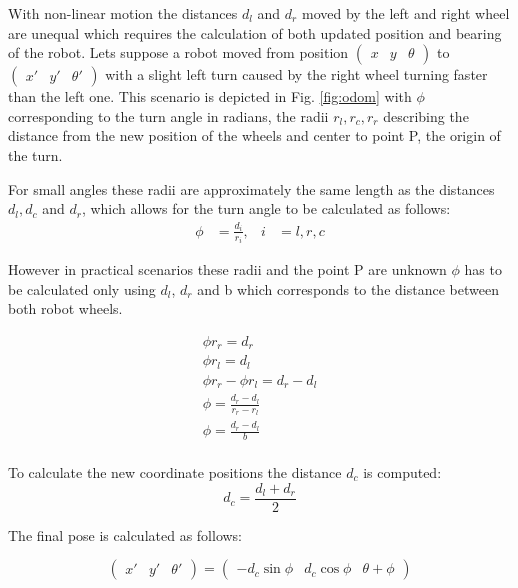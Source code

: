 With non-linear motion the distances $d_{l}$ and $d_{r}$ moved by the left and right wheel are unequal which requires the calculation of both updated position and bearing of the robot. 
Lets suppose a robot moved from position $\begin{pmatrix} x & y & \theta \end{pmatrix}$ to $\begin{pmatrix} x' & y' & \theta' \end{pmatrix}$ with a slight left turn caused by the right wheel turning faster than the left one. 
This scenario is depicted in Fig. \ref{fig:odom} with $\phi$ corresponding to the turn angle in radians, the radii $r_{l}, r_{c}, r_{r}$ describing the distance from the new position of the wheels and center to point P, the origin of the turn. 

For small angles these radii are approximately the same length as the distances $d_{l}, d_{c}$ and $d_{r}$, which allows for the turn angle to be calculated as follows:
\begin{align*}
	\phi &= \frac{d_{i}}{r_{i}}, & i &= l, r, c  
\end{align*}

However in practical scenarios these radii and the point P are unknown $\phi$ has to be calculated only using $d_{l}$, $d_{r}$ and b which corresponds to the distance between both robot wheels.

\begin{equation*}
	\begin{split}
		\phi r_{r} = d_{r} \\
		\phi r_{l} = d_{l} \\
		\phi r_{r} - \phi r_{l} = d_{r} - d_{l} \\
		\phi = \frac{d_{r} - d_{l}}{r_{r} - r_{l}} \\ 
		\phi = \frac{d_{r} - d_{l}}{b} \\
	\end{split}
\end{equation*}

To calculate the new coordinate positions the distance $d_{c}$ is computed:
\begin{equation*}
	d_{c} = \frac{d_{l} + d_{r}}{2}
\end{equation*}

The final pose is calculated as follows:

\begin{equation*}
	\begin{pmatrix}
		x' & y' & \theta'
	\end{pmatrix}
	= 
	\begin{pmatrix}
		-d_{c} \sin \phi & d_{c} \cos \phi & \theta + \phi
	\end{pmatrix}
\end{equation*}

